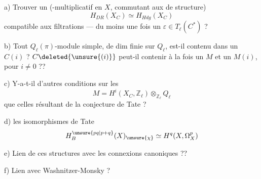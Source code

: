 
\uline{} a) Trouver un 
(-multiplicatif en $X$,  commutant aux  de structure)
\[
H_{DR}(X_C) \simeq H_{Hdg}(X_C)
\]
compatible aux filtrations --- du moins une fois  un  $\varepsilon\in T_\ell(C^*)$ ? 

b) Tout $Q_\ell(\pi)$-module simple, de dim finie sur $Q_\ell$, est-il contenu dans un $C(i)$ ?
$C\deleted{\unsure{(i)}}$ peut-il contenir à la fois un $M$ et un $M(i)$, pour $i\ne0$ ??

c) Y-a-t-il d'autres conditions sur les
\[
M=H^i(X_C,\mathbb Z_\ell)\otimes_{\mathbb Z_\ell}Q_\ell
\]
que celles résultant de la conjecture de Tate ?

d) \uline{} les isomorphismes de Tate
\[
H_B^{\unsure{pq|p+q}}(X)_{\unsure{\chi}}\simeq H^q(X,\Omega_X^p)
\]

e) Lien de  ces structures avec les connexions canoniques ??

f) Lien avec Washnitzer-Monsky ?

